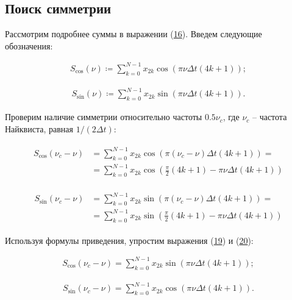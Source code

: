 \documentclass[12pt]{article}
\newcommand{\hl}[1]{(\hyperlink{eq:#1}{#1})}
\newcommand{\sd}[1]{\hypertarget{skip:#1}{\vspace{-10pt}}}
\newcommand{\hep}[2]{\vspace{#2pt}\hypertarget{eq:#1}{}\vspace{-#2pt}}
\begin{document}
\subsection{Поиск симметрии}

Рассмотрим подробнее суммы в выражении \hl{16}. Введем следующие обозначения:

\sd{17}
\begin{gather}
    S_{\cos}(\nu) \coloneqq \sum_{k = 0}^{N - 1} x_{2 k} \cos(\pi \nu \Delta t (4 k + 1));
\end{gather}

\sd{18}
\begin{gather}
    S_{\sin}(\nu) \coloneqq \sum_{k = 0}^{N - 1} x_{2 k} \sin(\pi \nu \Delta t (4 k + 1)).
\end{gather}

Проверим наличие симметрии относительно частоты $ 0.5 \nu_{c} $, где $ \nu_{c} $ -- частота Найквиста, равная $ 1 / (2 \Delta t) $:

\sd{19}\hep{19}{16.5}
\begin{gather}
    \begin{split}
    S_{\cos}(\nu_{c} - \nu) &= \sum_{k = 0}^{N - 1} x_{2 k} \cos(\pi (\nu_{c} - \nu) \Delta t (4 k + 1)) = \\
    &= \sum_{k = 0}^{N - 1} x_{2 k} \cos(\frac{\pi}{2} (4 k + 1) - \pi \nu \Delta t (4 k + 1))
    \end{split}
\end{gather}

\sd{20}\hep{20}{6}
\begin{gather}
    \begin{split}
    S_{\sin}(\nu_{c} - \nu) &= \sum_{k = 0}^{N - 1} x_{2 k} \sin(\pi (\nu_{c} - \nu) \Delta t (4 k + 1)) = \\
    &= \sum_{k = 0}^{N - 1} x_{2 k} \sin(\frac{\pi}{2} (4 k + 1) - \pi \nu \Delta t (4 k + 1))
    \end{split}
\end{gather}

Используя формулы приведения, упростим выражения \hl{19} и \hl{20}:

\sd{21}
\begin{gather}
    S_{\cos}(\nu_{c} - \nu) = \sum_{k = 0}^{N - 1} x_{2 k} \sin(\pi \nu \Delta t (4 k + 1));
\end{gather}

\sd{22}
\begin{gather}
    S_{\sin}(\nu_{c} - \nu) = \sum_{k = 0}^{N - 1} x_{2 k} \cos(\pi \nu \Delta t (4 k + 1)).
\end{gather}
\end{document}
